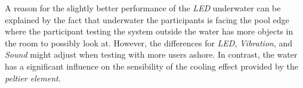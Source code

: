 A reason for the slightly better performance of the \emph{LED} underwater can be explained by the fact that underwater the participants is facing the pool edge where the participant testing the system outside the water has more objects in the room to possibly look at. 
However, the differences for \emph{LED}, \emph{Vibration}, and \emph{Sound} might adjust when testing with more users ashore.
In contrast, the water has a significant influence on the sensibility of the cooling effect provided by the \emph{peltier element}.





























